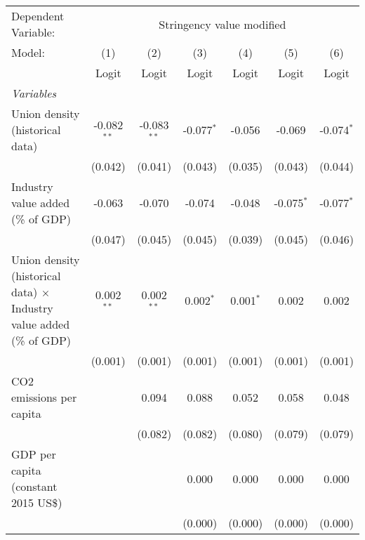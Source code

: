 
\begingroup
\centering
\begin{tabular}{lcccccc}
   \toprule
   Dependent Variable: & \multicolumn{6}{c}{Stringency value modified}\\
   Model:                                                                      & (1)           & (2)           & (3)          & (4)         & (5)          & (6)\\  
                                                                               &  Logit        & Logit         & Logit        & Logit       & Logit        & Logit\\  
   \midrule
   \emph{Variables}\\
   Union density (historical data)                                             & -0.082$^{**}$ & -0.083$^{**}$ & -0.077$^{*}$ & -0.056      & -0.069       & -0.074$^{*}$\\   
                                                                               & (0.042)       & (0.041)       & (0.043)      & (0.035)     & (0.043)      & (0.044)\\   
   Industry value added (\% of GDP)                                            & -0.063        & -0.070        & -0.074       & -0.048      & -0.075$^{*}$ & -0.077$^{*}$\\   
                                                                               & (0.047)       & (0.045)       & (0.045)      & (0.039)     & (0.045)      & (0.046)\\   
   Union density (historical data) $\times$ Industry value added (\% of GDP)   & 0.002$^{**}$  & 0.002$^{**}$  & 0.002$^{*}$  & 0.001$^{*}$ & 0.002        & 0.002\\   
                                                                               & (0.001)       & (0.001)       & (0.001)      & (0.001)     & (0.001)      & (0.001)\\   
   CO2 emissions per capita                                                    &               & 0.094         & 0.088        & 0.052       & 0.058        & 0.048\\   
                                                                               &               & (0.082)       & (0.082)      & (0.080)     & (0.079)      & (0.079)\\   
   GDP per capita (constant 2015 US\$)                                         &               &               & 0.000        & 0.000       & 0.000        & 0.000\\   
                                                                               &               &               & (0.000)      & (0.000)     & (0.000)      & (0.000)\\   

\end{tabular}

